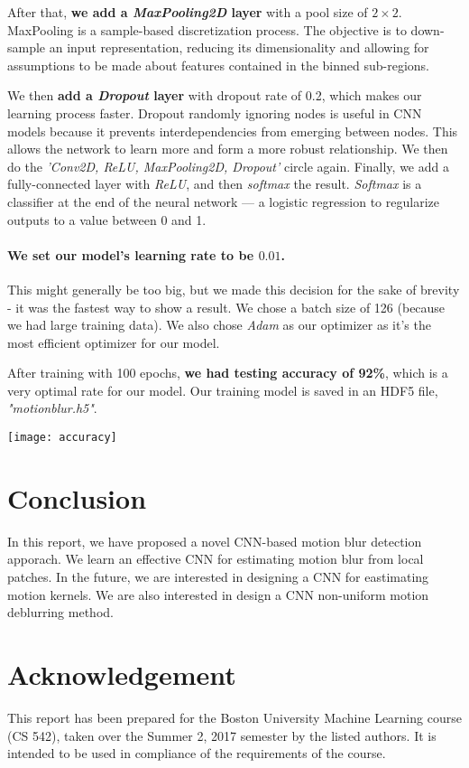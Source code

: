 \documentclass{article}
\begin{document}
After that, \textbf{we add a \textit{MaxPooling2D} layer} with a pool size of $2\times2$. 
MaxPooling is a sample-based discretization process. The objective is to down-sample an 
input representation, reducing its dimensionality and allowing for assumptions to be made 
about features contained in the binned sub-regions. 

We then \textbf{add a \textit{Dropout} layer} with dropout rate of 0.2, which makes our 
learning process faster. Dropout randomly ignoring nodes is useful in CNN models because 
it prevents interdependencies from emerging between nodes. This allows the network to learn 
more and form a more robust relationship. We then do the \textit{'Conv2D, ReLU, 
MaxPooling2D, Dropout'} circle again. Finally, we add a fully-connected layer with 
\textit{ReLU}, and then \textit{softmax} the result. \textit{Softmax} is a classifier at 
the end of the neural network — a logistic regression to regularize outputs to a value 
between 0 and 1. 

\paragraph{We set our model's learning rate to be $0.01$.} This might generally be too 
big, but we made this decision for the sake of brevity - it was the fastest way to show 
a result. We chose a batch size of 126 (because we had large training data). We also 
chose \textit{Adam} as our optimizer as it's the most efficient optimizer for our model.

After training with 100 epochs, \textbf{we had testing accuracy of 92\%}, which is a 
very optimal rate for our model. Our training model is saved in an HDF5 file, 
\textit{"motionblur.h5"}.

\texttt{[image: accuracy]} \\

\section{Conclusion}
In this report, we have proposed a novel CNN-based motion blur detection apporach. We 
learn an effective CNN for estimating motion blur from local patches. In the future, 
we are interested in designing a CNN for eastimating motion kernels. We are also interested 
in design a CNN non-uniform motion deblurring method.   

\section*{Acknowledgement}
This report has been prepared for the Boston University Machine Learning course (CS 542), 
taken over the Summer 2, 2017 semester by the listed authors. It is intended to be used 
in compliance of the requirements of the course. 
\end{document}
